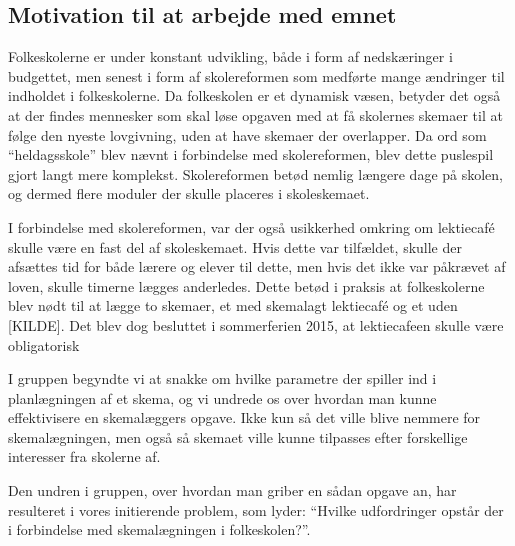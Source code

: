 \subsection{Motivation til at arbejde med emnet}
Folkeskolerne er under konstant udvikling, både i form af nedskæringer i budgettet, men senest i form af skolereformen som medførte mange ændringer til indholdet i folkeskolerne. Da folkeskolen er et dynamisk væsen, betyder det også at der findes mennesker som skal løse opgaven med at få skolernes skemaer til at følge den nyeste lovgivning, uden at have skemaer der overlapper. Da ord som ``heldagsskole'' blev nævnt i forbindelse med skolereformen, blev dette puslespil gjort langt mere komplekst. Skolereformen betød nemlig længere dage på skolen, og dermed flere moduler der skulle placeres i skoleskemaet.

I forbindelse med skolereformen, var der også usikkerhed omkring om lektiecaf\'e skulle være en fast del af skoleskemaet. Hvis dette var tilfældet, skulle der afsættes tid for både lærere og elever til dette, men hvis det ikke var påkrævet af loven, skulle timerne lægges anderledes. Dette betød i praksis at folkeskolerne blev nødt til at lægge to skemaer, et med skemalagt lektiecaf\'e og et uden [KILDE]. Det blev dog besluttet i sommerferien 2015, at lektiecafeen skulle være obligatorisk\cite{Lektiecafe} 

I gruppen begyndte vi at snakke om hvilke parametre der spiller ind i planlægningen af et skema, og vi undrede os over hvordan man kunne effektivisere en skemalæggers opgave. Ikke kun så det ville blive nemmere for skemalægningen, men også så skemaet ville kunne tilpasses efter forskellige interesser fra skolerne af.

Den undren i gruppen, over hvordan man griber en sådan opgave an, har resulteret i vores initierende problem, som lyder: ``Hvilke udfordringer opstår der i forbindelse med skemalægningen i folkeskolen?''.

